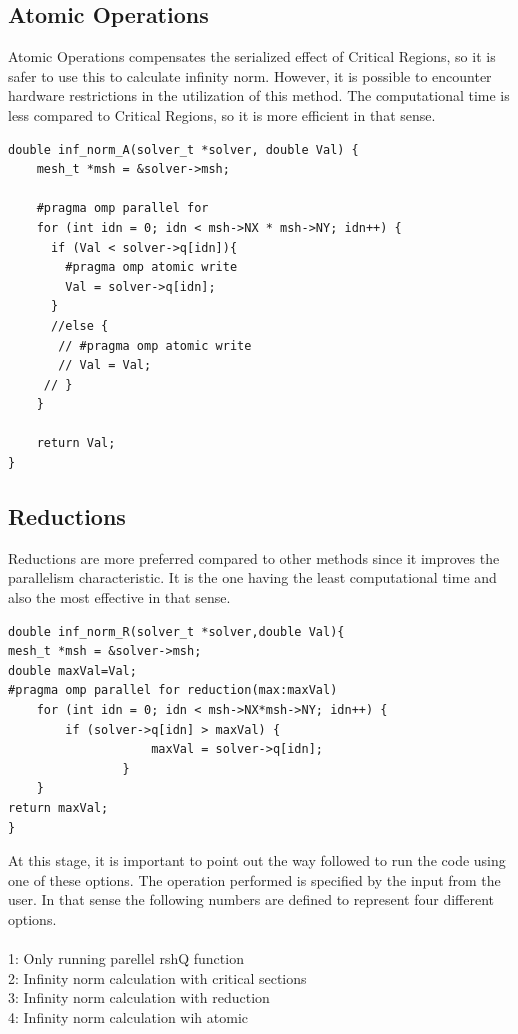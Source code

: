 \documentclass{article}
\begin{document}
\subsection{Atomic Operations}
Atomic Operations compensates the serialized effect of Critical Regions, so it is safer to use this to calculate infinity norm. However, it is possible to encounter hardware restrictions in the utilization of this method. The computational time is less compared to Critical Regions, so it is more efficient in that sense. 

\begin{verbatim}
double inf_norm_A(solver_t *solver, double Val) {
    mesh_t *msh = &solver->msh;

    #pragma omp parallel for
    for (int idn = 0; idn < msh->NX * msh->NY; idn++) {
      if (Val < solver->q[idn]){
        #pragma omp atomic write
        Val = solver->q[idn];
      }
      //else {
       // #pragma omp atomic write
       // Val = Val;
     // }
    }

    return Val;
}
\end{verbatim}

\subsection{Reductions}
Reductions are more preferred compared to other methods since it improves the parallelism characteristic. It is the one having the least computational time and also the most effective in that sense. 

\begin{verbatim}
double inf_norm_R(solver_t *solver,double Val){
mesh_t *msh = &solver->msh;
double maxVal=Val;
#pragma omp parallel for reduction(max:maxVal)
    for (int idn = 0; idn < msh->NX*msh->NY; idn++) {
        if (solver->q[idn] > maxVal) {
                    maxVal = solver->q[idn];
                }
    }
return maxVal;
}
\end{verbatim}

At this stage, it is important to point out the way followed to run the code using one of these options. The operation performed is specified by the input from the user. In that sense the following numbers are defined to represent four different options. \\ \\1: Only running parellel rshQ function \\
2: Infinity norm calculation with critical sections \\
3: Infinity norm calculation with reduction \\
4: Infinity norm calculation wih atomic \\
\end{document}
